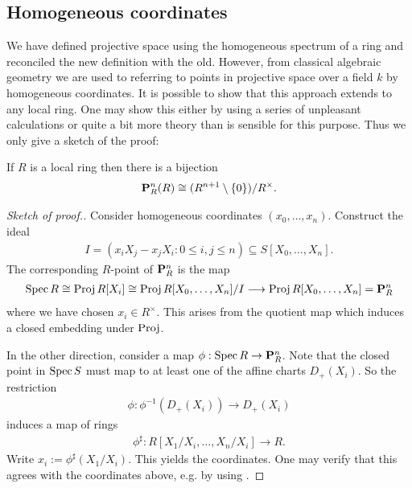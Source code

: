 \documentclass{article}
\begin{document}
\subsection{Homogeneous coordinates}

We have defined projective space using the homogeneous spectrum
of a ring and reconciled the new definition with the old. However,
from classical algebraic geometry we are used to referring to points
in projective space over a field $k$ by homogeneous coordinates.
It is possible to show that this approach extends to any local ring.
One may show this either by using a series of unpleasant calculations
or quite a bit more theory than is sensible for this purpose.
Thus we only give a sketch of the proof:

\begin{lemma}
  If $R$ is a local ring then there is a bijection
  \begin{align*}
    \mathbf{P}^{n}_{R}(R) \cong
    (R^{n+1}\setminus\left\lbrace{0}\right\rbrace)/R^\times.
  \end{align*}
  \begin{proof}[Sketch of proof.]
    Consider homogeneous coordinates $(x_0,\ldots,x_n)$.
    Construct the ideal
    \begin{align}\label{eq:homogeneous_ideal}
      I = (x_i X_j - x_j X_i : 0 \leq i,j\leq n) \subseteq S[X_0,\ldots,X_n].
    \end{align}
    The corresponding $R$-point of $\mathbf{P}^{n}_{R}$ is the map
    \begin{align*}
      \operatorname{Spec} R \cong
      \operatorname{Proj} R[X_i] \cong
      \operatorname{Proj} R[X_0,\ldots,X_n]/I
      \longrightarrow \operatorname{Proj} R[X_0,\ldots,X_n]
      = \mathbf{P}^{n}_{R}
    \end{align*}
    where we have chosen $x_i\in R^\times$.
    This arises from the quotient map which induces a closed
    embedding under $\operatorname{Proj}$. \cite{ellingsrud2023}


    In the other direction, consider a map
    $\phi:\operatorname{Spec} R \to \mathbf{P}^{n}_{R}$.
    Note that the closed point in $\operatorname{Spec} S$ must map to at least
    one of the affine charts $D_+(X_i)$. So the
    restriction
    \begin{align*}
      \phi : {\phi}^{-1}(D_+(X_i)) \to D_+(X_i)
    \end{align*}
    induces a map of rings
    \begin{align*}
      \phi^\sharp : R[X_1/X_i,\ldots,X_n/X_i] \to R.
    \end{align*}
    Write $x_i := \phi^\sharp(X_1/X_i)$. This yields the
    coordinates. One may verify that this agrees with the
    coordinates above, e.g. by using \cite[{Proposition 13.24}]{gortz2010}.
  \end{proof}
\end{lemma}
\end{document}

